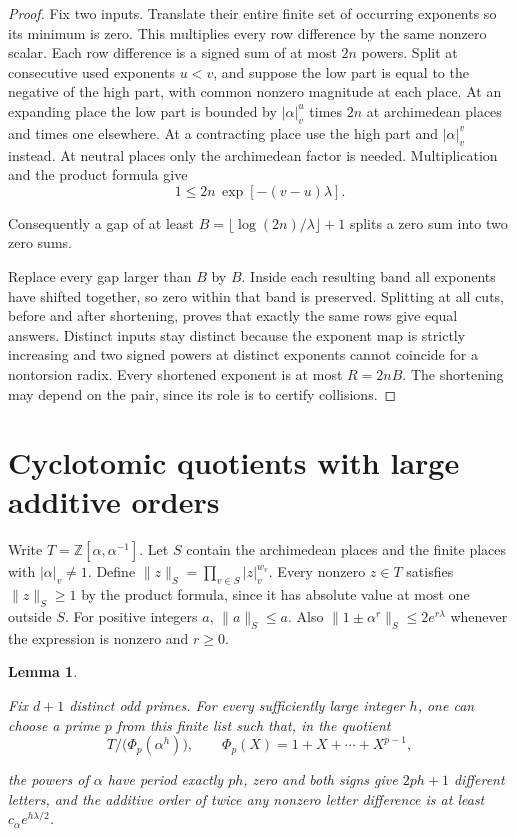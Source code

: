 \documentclass[11pt,letterpaper]{article}
\newtheorem{lemma}[theorem]{Lemma}
\numberwithin{equation}{section}
\begin{document}
\begin{proof}

Fix two inputs. Translate their entire finite set of occurring exponents so its minimum is
zero. This multiplies every row difference by the same nonzero scalar. Each row difference is
a signed sum of at most $2n$ powers. Split at consecutive used exponents $u<v$, and suppose
the low part is equal to the negative of the high part, with common nonzero magnitude at each
place. At an expanding place the low part is bounded by $|\alpha|_v^u$ times $2n$ at
archimedean places and times one elsewhere. At a contracting place use the high part and
$|\alpha|_v^v$ instead. At neutral places only the archimedean factor is needed.
Multiplication and the product formula give
\[
1\le 2n\,\exp[-(v-u)\lambda].
\]

Consequently a gap of at least $B=\lfloor\log(2n)/\lambda\rfloor+1$ splits a zero sum into two zero sums.

Replace every gap larger than $B$ by $B$. Inside each resulting band all exponents have
shifted together, so zero within that band is preserved. Splitting at all cuts, before and
after shortening, proves that exactly the same rows give equal answers. Distinct inputs stay
distinct because the exponent map is strictly increasing and two signed powers at distinct
exponents cannot coincide for a nontorsion radix. Every shortened exponent is at most $R=2nB$.
The shortening may depend on the pair, since its role is to certify collisions.
\end{proof}

\section{Cyclotomic quotients with large additive orders}\label{sec:projection}

Write $T=\mathbb Z[\alpha,\alpha^{-1}]$. Let $S$ contain the archimedean places and the finite
places with $|\alpha|_v\ne1$. Define $\|z\|_S=\prod_{v\in S}|z|_v^{w_v}$. Every nonzero $z\in
T$ satisfies $\|z\|_S\ge1$ by the product formula, since it has absolute value at most one
outside $S$. For positive integers $a$, $\|a\|_S\le a$. Also
$\|1\pm\alpha^r\|_S\le2e^{r\lambda}$ whenever the expression is nonzero and $r\ge0$.

\begin{lemma}\label{lem:proj}

Fix $d+1$ distinct odd primes. For every sufficiently large integer $h$, one can choose a
prime $p$ from this finite list such that, in the quotient
\[
T/\bigl(\Phi_p(\alpha^h)\bigr),\qquad \Phi_p(X)=1+X+\cdots+X^{p-1},
\]

the powers of $\alpha$ have period exactly $ph$, zero and both signs give $2ph+1$ different
letters, and the additive order of twice any nonzero letter difference is at least $c_\alpha
e^{h\lambda/2}$.
\end{lemma}
\end{document}
